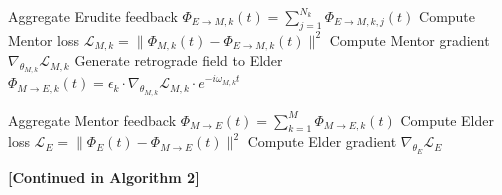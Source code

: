 \begin{algorithm}
\begin{algorithmic}[1]
        \State Aggregate Erudite feedback $\Phi_{E \rightarrow M,k}(t) = \sum_{j=1}^{N_k} \Phi_{E \rightarrow M,k,j}(t)$
        \State Compute Mentor loss $\mathcal{L}_{M,k} = \|\Phi_{M,k}(t) - \Phi_{E \rightarrow M,k}(t)\|^2$
        \State Compute Mentor gradient $\nabla_{\theta_{M,k}} \mathcal{L}_{M,k}$
        \State Generate retrograde field to Elder $\Phi_{M \rightarrow E,k}(t) = \epsilon_k \cdot \nabla_{\theta_{M,k}}\mathcal{L}_{M,k} \cdot e^{-i\omega_{M,k}t}$
    \EndFor
    
    \State Aggregate Mentor feedback $\Phi_{M \rightarrow E}(t) = \sum_{k=1}^{M} \Phi_{M \rightarrow E,k}(t)$
    \State Compute Elder loss $\mathcal{L}_E = \|\Phi_E(t) - \Phi_{M \rightarrow E}(t)\|^2$
    \State Compute Elder gradient $\nabla_{\theta_E} \mathcal{L}_E$
    
    \State \textbf{[Continued in Algorithm 2]}
\EndFor
\end{algorithmic}
\end{algorithm}

